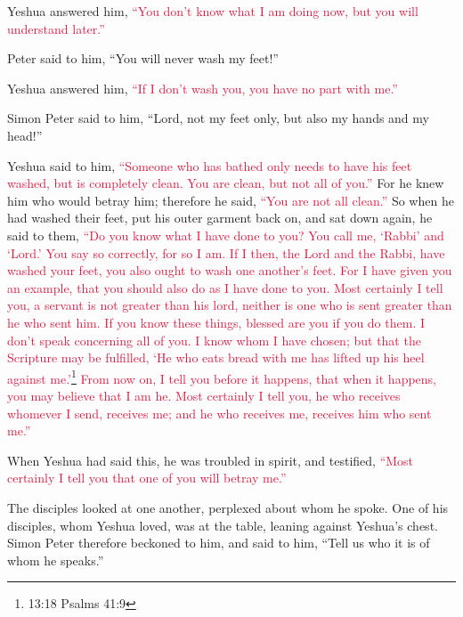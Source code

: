 \myverse{}Yeshua answered him,
\textcolor{crimson}{“You don’t know what I am doing now, but you will understand later.”}

\myverse{}Peter said to him, “You will never wash my feet!”

Yeshua answered him,
\textcolor{crimson}{“If I don’t wash you, you have no part with me.”
}

\myverse{}Simon Peter said to him, “Lord, not my feet only, but also my
hands and my head!”

\myverse{}Yeshua said to him,
\textcolor{crimson}{“Someone who has bathed only needs to have his feet washed, but is completely clean. You are clean,
	but not all of you.”
}
\myverse{}For he knew him who would betray him; therefore he said,
\textcolor{crimson}{“You are not all clean.”}
\myverse{}So when he had washed their feet, put his outer garment back on, and sat
down again, he said to them,
\textcolor{crimson}{“Do you know what I have done to you?
}
\myverse{}\textcolor{crimson}{You call me, ‘Rabbi’ and ‘Lord.’ You say so correctly, for so I am.
}
\myverse{}\textcolor{crimson}{If I then, the Lord and the Rabbi, have washed your feet, you also ought
	to wash one another’s feet.
}
\myverse{}\textcolor{crimson}{For I have given you an example, that you should also do as I have done
	to you.
}
\myverse{}\textcolor{crimson}{Most certainly I tell you, a servant is not greater than his lord, neither
	is one who is sent greater than he who sent him.
}
\myverse{}\textcolor{crimson}{If you know these things, blessed are you if you do them.
}
\myverse{}\textcolor{crimson}{I don’t speak concerning all of you. I know whom I have chosen; but that
	the Scripture may be fulfilled, ‘He who eats bread with me has lifted up his heel against me.’}\footnote{13:18 Psalms 41:9}
\myverse{}\textcolor{crimson}{From now on, I tell you before it happens, that when it happens, you
	may believe that I am he.
}
\myverse{}\textcolor{crimson}{Most certainly I tell you, he who receives whomever I send, receives
	me; and he who receives me, receives him who sent me.”}

\myverse{}When Yeshua had said this, he was troubled in spirit, and testified,
\textcolor{crimson}{“Most certainly I tell you that one of you will betray me.”}

\myverse{}The disciples looked at one another, perplexed about whom he
spoke.
\myverse{}One of his disciples, whom Yeshua loved, was at the table, leaning against
Yeshua’s chest.
\myverse{}Simon Peter therefore beckoned to him, and said to him, “Tell us who it is
of whom he speaks.”

